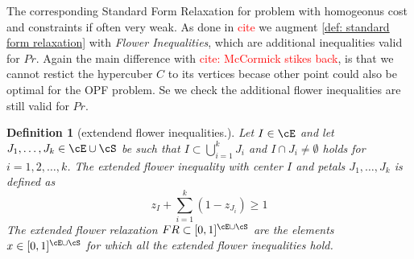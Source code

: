 \documentclass{article}
\newtheorem{definition}{Definition}
\begin{document}
	The corresponding Standard Form Relaxation for problem with homogeonus cost and constraints if often very weak. As done in \textcolor{red}{cite} we augment \ref{def: standard form relaxation} with \emph{Flower Inequalities}, which are additional inequalities valid for \(Pr\).
	Again the main difference with \textcolor{red}{cite: McCormick stikes back}, is that we cannot restict the hypercuber \(C\) to its vertices becase other point could also be optimal for the OPF problem. Se we check the additional flower inequalities are still valid for \(Pr\).
	
	\begin{definition}[extendend flower inequalities.]
		Let \(I \in \cE\) and let \(J_1,\ldots,J_k \in \cE \cup \cS\) be such that \(I \subset \bigcup_{i=1}^kJ_i\) and \(I \cap J_i \neq \emptyset\) holds for \(i = 1,2,\ldots,k\). The \emph{extended flower inequality} with center \(I\) and petals \(J_1,\ldots,J_k\) is defined as
		\begin{equation}\label{constr: extended flower inequality}
			z_I + \sum_{i=1}^k(1-z_{J_i}) \geq 1
		\end{equation}
		The extended flower relaxation \(FR \subset [0,1]^{\cE\cup\cS}\) are the elements \(x \in [0,1]^{\cE\cup\cS}\) for which all the extended flower inequalities hold.
	\end{definition}
	
\end{document}
